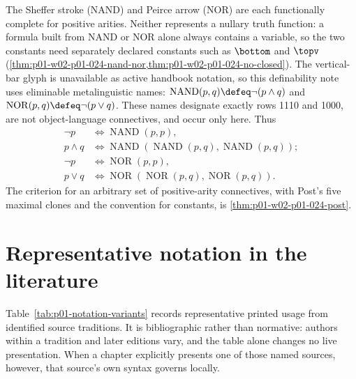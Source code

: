 The Sheffer stroke (NAND) and Peirce arrow (NOR) are each functionally
complete for positive arities.  Neither represents a nullary truth
function: a formula built from NAND or NOR alone always contains a
variable, so the two constants need separately declared constants such as
\(\bottom\) and \(\topv\)
(\cref{thm:p01-w02-p01-024-nand-nor,thm:p01-w02-p01-024-no-closed}).
The vertical-bar glyph is unavailable as active handbook notation, so this
definability note uses eliminable metalinguistic names:
\(\operatorname{NAND}(p,q)\defeq\neg(p\land q)\) and
\(\operatorname{NOR}(p,q)\defeq\neg(p\lor q)\).  These names designate
exactly rows 1110 and 1000, are not object-language connectives, and occur
only here.  Thus
\[
\begin{aligned}
\neg p&\Leftrightarrow\operatorname{NAND}(p,p),\\
p\land q&\Leftrightarrow
 \operatorname{NAND}(\operatorname{NAND}(p,q),
                     \operatorname{NAND}(p,q));\\
\neg p&\Leftrightarrow\operatorname{NOR}(p,p),\\
p\lor q&\Leftrightarrow
 \operatorname{NOR}(\operatorname{NOR}(p,q),
                    \operatorname{NOR}(p,q)).
\end{aligned}
\]
The criterion for an arbitrary set of positive-arity connectives, with
Post's five maximal clones and the convention for constants, is
\cref{thm:p01-w02-p01-024-post}.

\section{Representative notation in the literature}
\label{sec:p01-notation-variants}

Table~\ref{tab:p01-notation-variants} records representative printed usage
from identified source traditions.  It is bibliographic rather than
normative: authors within a tradition and later editions vary, and the table
alone changes no live presentation.  When a chapter explicitly presents one
of those named sources, however, that source's own syntax governs locally.

